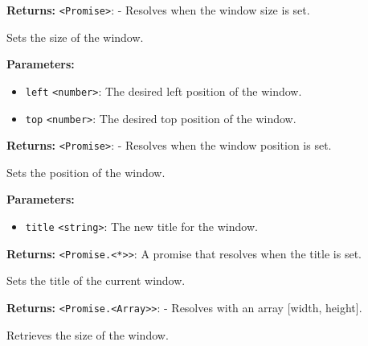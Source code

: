 \documentclass[12pt,a4paper]{article}
\begin{document}
\noindent \textbf{Returns:} \texttt{<Promise>}: - Resolves when the window size is set.

\noindent Sets the size of the window.

\vspace{5mm}
\noindent {}


\noindent \textbf{Parameters:}
\begin{itemize}
  \item \texttt{left} \texttt{<number>}: The desired left position of the window.
  \item \texttt{top} \texttt{<number>}: The desired top position of the window.
\end{itemize}

\noindent \textbf{Returns:} \texttt{<Promise>}: - Resolves when the window position is set.

\noindent Sets the position of the window.

\vspace{5mm}
\noindent {}


\noindent \textbf{Parameters:}
\begin{itemize}
  \item \texttt{title} \texttt{<string>}: The new title for the window.
\end{itemize}

\noindent \textbf{Returns:} \texttt{<Promise.<*>>}: A promise that resolves when the title is set.

\noindent Sets the title of the current window.

\vspace{5mm}
\noindent {}


\noindent \textbf{Returns:} \texttt{<Promise.<Array>>}: - Resolves with an array [width, height].

\noindent Retrieves the size of the window.

\vspace{5mm}
\noindent {}
\end{document}
